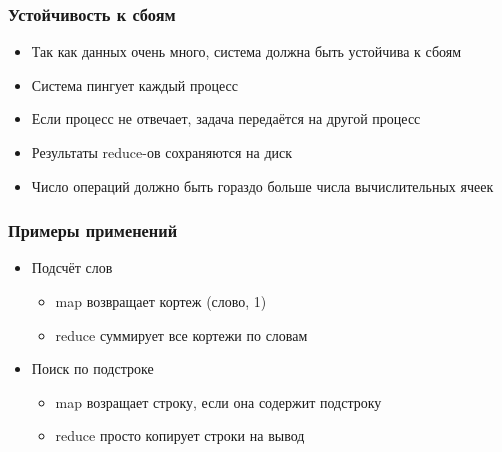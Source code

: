 \documentclass[xetex,mathserif,serif]{beamer}
\begin{document}
\begin{frame}

	\frametitle{Устойчивость к сбоям}

	\begin{itemize}
		\item Так как данных очень много, система должна быть устойчива к сбоям
		\item Система пингует каждый процесс
		\item Если процесс не отвечает, задача передаётся на другой процесс
		\item Результаты reduce-ов сохраняются на диск
		\item Число операций должно быть гораздо больше числа вычислительных ячеек
	\end{itemize}

\end{frame}

\begin{frame}

	\frametitle{Примеры применений}

	\begin{itemize}
		\item Подсчёт слов
		      \begin{itemize}
			      \item map возвращает кортеж (слово, 1)
			      \item reduce суммирует все кортежи по словам
		      \end{itemize}
		\item Поиск по подстроке
		      \begin{itemize}
			      \item map возращает строку, если она содержит подстроку
			      \item reduce просто копирует строки на вывод
		      \end{itemize}
	\end{itemize}

\end{frame}
\end{document}
